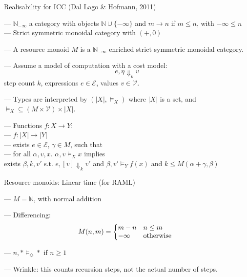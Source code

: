 \documentclass[xetex,serif,mathserif,aspectratio=169]{beamer}
\newcommand{\youtem}{\quad \textcolor{titlered!80}{---} \quad}
\newcommand{\HEAD}[1]{\textcolor{titlered}{#1}}
\begin{document}
\begin{frame}
  \HEAD{Realisability for ICC}
  \quad\qquad \textcolor{black!60}{(Dal Lago \& Hofmann, 2011)}

\bigskip

  \newcommand{\diffcat}{\mathbb{N}_{-\infty}}

  \youtem $\diffcat$ a category with objects
  $\mathbb{N} \cup \{-\infty\}$ and $m \to n$ if $m \leq n$, with
  $-\infty \leq n$ \\
  \quad \qquad\youtem Strict symmetric monoidal category with $(+, 0)$

  \medskip

  \youtem A resource monoid $M$ is a $\diffcat$ enriched strict
  symmetric monoidal category. \\

  \medskip

  \youtem Assume a model of computation with a cost model:
  \begin{displaymath}
    e, \eta \Downarrow_k v
  \end{displaymath}
  \qquad\quad step count $k$, expressions $e \in \mathcal{E}$, values $v \in \mathcal{V}$.

  \medskip

  \youtem Types are interpreted by $(|X|, \models_X)$ where $|X|$ is a
  set, and $\models_X \subseteq (M \times \mathcal{V})\times |X|$.

  \medskip

  \youtem Functions $f : X \to Y$: \\
  \qquad \youtem $f : |X| \to |Y|$ \\
  \qquad \youtem exists $e \in \mathcal{E}$, $\gamma \in M$, such that \\
  \qquad \youtem for all $\alpha, v, x$. $\alpha, v \models_{X} x$ implies\\
  \qquad\qquad\qquad exists $\beta, k, v'$ s.t. $e, [v] \Downarrow_k v'$ and $\beta, v' \models_Y f(x)$ and $k \leq M(\alpha+\gamma, \beta)$
\end{frame}

\begin{frame}
  \HEAD{Resource monoids: } Linear time (for RAML)

  \bigskip

  \youtem $M = \mathbb{N}$, with normal addition

  \smallskip

  \youtem Differencing:
  \begin{displaymath}
    M(n,m) = \left\{\begin{array}{@{}ll} m - n & n \leq m \\ -\infty & \textrm{otherwise} \end{array}\right.
  \end{displaymath}

  \youtem $n, \texttt{*} \models_\Diamond *$ if $n \geq 1$

  \youtem Wrinkle: this counts recursion steps, not the actual number
  of steps.

\end{frame}
\end{document}
